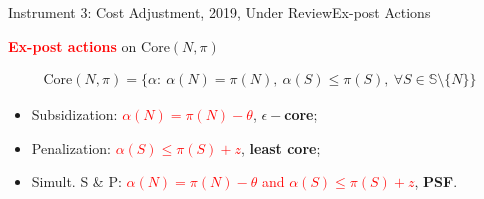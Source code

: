 \documentclass[14pt]{beamer}
\begin{document}
\begin{frame}{Instrument 3: Cost Adjustment, {\footnotesize 2019, Under Review}}{Ex-post Actions}
\vspace{-5mm}
\begin{shaded}
\small
\centering
\textcolor{red}{\bf Ex-post actions} on $\mathrm{Core}(N,\pi)$
\end{shaded}
\vspace{-5mm}
\begin{small}
\vspace{-5mm}
\begin{eqnarray*}
\mathrm{Core}(N,\pi) = \bigg\{ \alpha:~ \alpha(N)=\pi(N),  ~\alpha(S) \leq \pi(S), ~\forall S \in \mathbb{S} \setminus \{N\}  \bigg\}
\end{eqnarray*}
\end{small}
\vspace{-5mm}
\begin{itemize}
\small
\item Subsidization: \textcolor{red}{$\alpha(N)=\pi(N)-\theta$}, \textbf{$\epsilon-$core};
\item Penalization: \textcolor{red}{$\alpha(S) \leq \pi(S)+z$}, \textbf{least core};
\item Simult. S \& P: \textcolor{red}{$\alpha(N)=\pi(N)-\theta$ and $\alpha(S) \leq \pi(S)+z$}, \textbf{PSF}.
\end{itemize}
\end{frame}
\end{document}

